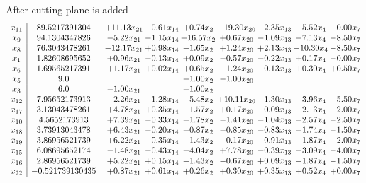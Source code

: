 \documentclass[8pt]{article}
\begin{document}
 After cutting plane is added 
\[\begin{array}{c| c c@{\hskip 2pt} c@{\hskip 2pt} c@{\hskip 2pt} c@{\hskip 2pt} c@{\hskip 2pt} c@{\hskip 2pt} c@{\hskip 2pt} }
 x_{11}   &  89.5217391304 & + 11.13 x_{21} & -0.61 x_{14} & +  0.74 x_{2} & -19.30 x_{20} & -2.35 x_{13} & -5.52 x_{4} & -0.00 x_{7}\\
 x_{9}   &  94.1304347826 & -5.22 x_{21} & -1.15 x_{14} & -16.57 x_{2} & +  0.67 x_{20} & -1.09 x_{13} & -7.13 x_{4} & -8.50 x_{7}\\
 x_{8}   &  76.3043478261 & -12.17 x_{21} & +  0.98 x_{14} & -1.65 x_{2} & +  1.24 x_{20} & +  2.13 x_{13} & -10.30 x_{4} & -8.50 x_{7}\\
 x_{1}   &  1.82608695652 & +  0.96 x_{21} & -0.13 x_{14} & +  0.09 x_{2} & -0.57 x_{20} & -0.22 x_{13} & +  0.17 x_{4} & -0.00 x_{7}\\
 x_{6}   &  1.69565217391 & +  1.17 x_{21} & +  0.02 x_{14} & +  0.65 x_{2} & -1.24 x_{20} & -0.13 x_{13} & +  0.30 x_{4} & +  0.50 x_{7}\\
 x_{5}   &  9.0  &    &   & -1.00 x_{2} & -1.00 x_{20} &    &    &   \\
 x_{3}   &  6.0 & -1.00 x_{21} &   & -1.00 x_{2} &    &    &    &   \\
 x_{12}   &  7.95652173913 & -2.26 x_{21} & -1.28 x_{14} & -5.48 x_{2} & + 10.11 x_{20} & -1.30 x_{13} & -3.96 x_{4} & -5.50 x_{7}\\
 x_{17}   &  3.13043478261 & +  4.78 x_{21} & +  0.35 x_{14} & -1.57 x_{2} & +  0.17 x_{20} & -0.09 x_{13} & -2.13 x_{4} & -2.00 x_{7}\\
 x_{10}   &  4.5652173913 & +  7.39 x_{21} & -0.33 x_{14} & -1.78 x_{2} & -1.41 x_{20} & -1.04 x_{13} & -2.57 x_{4} & -2.50 x_{7}\\
 x_{18}   &  3.73913043478 & +  6.43 x_{21} & -0.20 x_{14} & -0.87 x_{2} & -0.85 x_{20} & -0.83 x_{13} & -1.74 x_{4} & -1.50 x_{7}\\
 x_{19}   &  3.86956521739 & +  6.22 x_{21} & -0.35 x_{14} & -1.43 x_{2} & -0.17 x_{20} & -0.91 x_{13} & -1.87 x_{4} & -2.00 x_{7}\\
 x_{15}   &  6.08695652174 & -1.48 x_{21} & -0.43 x_{14} & -4.04 x_{2} & +  7.78 x_{20} & -0.39 x_{13} & -3.09 x_{4} & -4.00 x_{7}\\
 x_{16}   &  2.86956521739 & +  5.22 x_{21} & +  0.15 x_{14} & -1.43 x_{2} & -0.67 x_{20} & +  0.09 x_{13} & -1.87 x_{4} & -1.50 x_{7}\\
 x_{22}   &  -0.521739130435 & +  0.87 x_{21} & +  0.61 x_{14} & +  0.26 x_{2} & +  0.30 x_{20} & +  0.35 x_{13} & +  0.52 x_{4} & +  0.00 x_{7}\\

\end{array}\]
\end{document}
